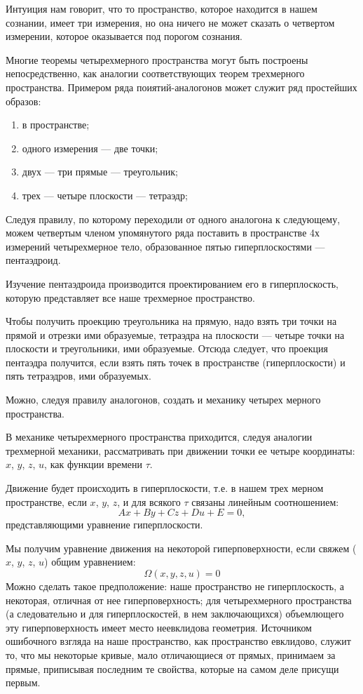 Интуиция нам говорит, что то пространство, которое находится в нашем сознании,
имеет три измерения, но она ничего не может сказать о четвертом измерении,
которое оказывается под порогом сознания. 

Многие теоремы четырехмерного пространства могут быть построены
непосредственно, как аналогии соответствующих теорем трехмерного
пространства. Примером ряда поиятий-аналогонов может служит ряд простейших
образов: 
\begin{enumerate}
  \item в пространстве;
  \item одного измерения --- две точки;
  \item двух --- три прямые --- треугольник;
  \item трех --- четыре плоскости --- тетраэдр;
\end{enumerate}
Следуя правилу, по которому переходили от одного аналогона к следующему, можем
четвертым членом упомянутого ряда поставить в пространстве 4х измерений
четырехмерное тело, образованное пятью гиперплоскостями --- пентаэдроид.

Изучение пентаэдроида производится проектированием его в гиперплоскость,
которую представляет все наше трехмерное пространство.

Чтобы получить проекцию треугольника на прямую, надо взять три точки на прямой
и отрезки ими образуемые, тетраэдра на плоскости --- четыре точки на плоскости
и треугольники, ими образуемые. Отсюда следует, что проекция пентаэдра
получится, если взять пять точек в пространстве (гиперплоскости) и пять
тетраэдров, ими образуемых. 

Можно, следуя правилу аналогонов, создать и механику четырех мерного
пространства. 

В механике четырехмерного пространства приходится, следуя аналогии трехмерной
механики, рассматривать при движении точки ее четыре координаты: $x$, $y$, $z$,
$u$, как функции времени $\tau$. 

Движение будет происходить в гиперплоскости, т.е. в нашем трех мерном
пространстве, если $x$, $y$, $z$, и для всякого $\tau$ связаны линейным 
соотношением: 
\begin{equation}
  Ax + By + Cz + Du + E = 0,
\end{equation}
представляющими уравнение гиперплоскости.

Мы получим уравнение движения на некоторой гиперповерхности, если свяжем ($x$,
$y$, $z$, $u$) общим уравнением: 
\begin{equation}
  \Omega(x, y, z, u) = 0
  \label{eq:move}
\end{equation}
Можно сделать такое предположение: наше пространство не гиперплоскость, а
некоторая, отличная от нее гиперповерхность; для четырехмерного пространства
(а следовательно и для гиперплоскостей, в нем заключающихся) объемлющего эту
гиперповерхность имеет место неевклидова геометрия. Источником ошибочного
взгляда на наше пространство, как пространство евклидово, служит то, что мы
некоторые кривые, мало отличающиеся от прямых, принимаем за прямые, приписывая
последним те свойства, которые на самом деле присущи первым. 

